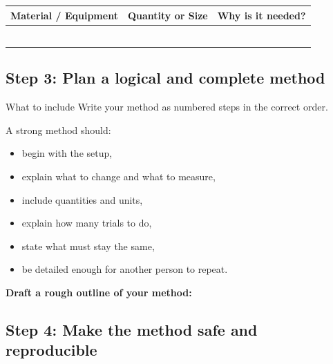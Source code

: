 \documentclass[12pt]{article}
\begin{document}
\begin{center}
\begin{tabularx}{\textwidth}{|>{\raggedright\arraybackslash}X|>{\raggedright\arraybackslash}X|>{\raggedright\arraybackslash}X|}
\hline
\textbf{Material / Equipment} & \textbf{Quantity or Size} & \textbf{Why is it needed?} \\ \hline
& & \\[0.8em] \hline
& & \\[0.8em] \hline
& & \\[0.8em] \hline
& & \\[0.8em] \hline
& & \\[0.8em] \hline
& & \\[0.8em] \hline
\end{tabularx}
\end{center}

\subsection*{Step 3: Plan a logical and complete method}

\begin{infobox}{What to include}
Write your method as numbered steps in the correct order.

A strong method should:
\begin{itemize}[leftmargin=1.5em]
    \item begin with the setup,
    \item explain what to change and what to measure,
    \item include quantities and units,
    \item explain how many trials to do,
    \item state what must stay the same,
    \item be detailed enough for another person to repeat.
\end{itemize}
\end{infobox}

\textbf{Draft a rough outline of your method:}

\vspace{12em}

\vspace{1em}

\subsection*{Step 4: Make the method safe and reproducible}
\end{document}
